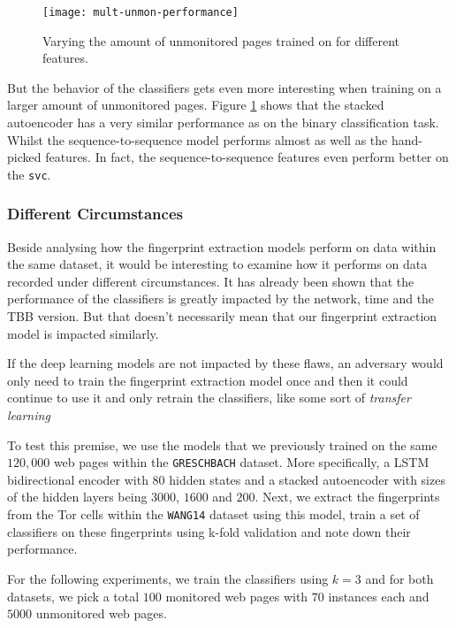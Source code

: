 \begin{figure}[ht]
  \centering
  \texttt{[image: mult-unmon-performance]}
  \caption{Varying the amount of unmonitored pages trained on for different features.}
  \label{fig:mult-unmon-performance}
\end{figure}

But the behavior of the classifiers gets even more interesting when training on a larger amount of unmonitored pages.
Figure \ref{fig:mult-unmon-performance} shows that the stacked autoencoder has a very similar performance as on the binary classification task.
Whilst the sequence-to-sequence model performs almost as well as the hand-picked features.
In fact, the sequence-to-sequence features even perform better on the \texttt{svc}.

\subsubsection{Different Circumstances}

Beside analysing how the fingerprint extraction models perform on data within the same dataset, it would be interesting to examine how it performs on data recorded under different circumstances.
It has already been shown that the performance of the classifiers is greatly impacted by the network, time and the TBB version.
But that doesn't necessarily mean that our fingerprint extraction model is impacted similarly.

If the deep learning models are not impacted by these flaws, an adversary would only need to train the fingerprint extraction model once and then it could continue to use it and only retrain the classifiers, like some sort of \textit{transfer learning}

To test this premise, we use the models that we previously trained on the same $120,000$ web pages within the \texttt{GRESCHBACH} dataset.
More specifically, a LSTM bidirectional encoder with $80$ hidden states and a stacked autoencoder with sizes of the hidden layers being $3000$, $1600$ and $200$.
Next, we extract the fingerprints from the Tor cells within the \texttt{WANG14} dataset using this model, train a set of classifiers on these fingerprints using k-fold validation and note down their performance.

For the following experiments, we train the classifiers using $k = 3$ and for both datasets, we  pick a total $100$ monitored web pages with $70$ instances each and $5000$ unmonitored web pages.

